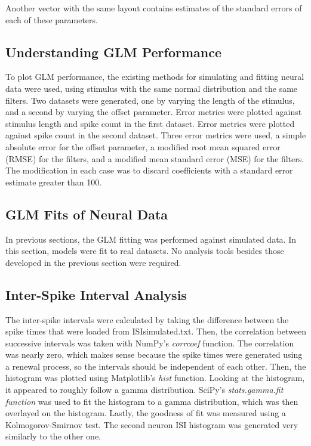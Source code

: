 \documentclass[letterpaper,titlepage,10pt]{article}
\begin{document}
Another vector with the same layout contains estimates of the standard errors of each of these parameters.

\subsection{Understanding GLM Performance}

To plot GLM performance, the existing methods for simulating and fitting neural data were used, using stimulus with
the same normal distribution and the same filters. Two datasets were generated, one by varying the length of the
stimulus, and a second by varying the offset parameter. Error metrics were plotted against stimulus length and spike
count in the first dataset. Error metrics were plotted against spike count in the second dataset. Three error metrics
were used, a simple absolute error for the offset parameter, a modified root mean squared error (RMSE) for the filters,
and a modified mean standard error (MSE) for the filters. The modification in each case was to discard coefficients
with a standard error estimate greater than 100.

\subsection{GLM Fits of Neural Data}

In previous sections, the GLM fitting was performed against simulated data. In this section, models were fit to real
datasets. No analysis tools besides those developed in the previous section were required.

\subsection{Inter-Spike Interval Analysis}

The inter-spike intervals were calculated by taking the difference between the spike times that were loaded from
ISIsimulated.txt. Then, the correlation between successive intervals was taken with NumPy's \textit{corrcoef} function.
The correlation was nearly zero, which makes sense because the spike times were generated using a renewal process,
so the intervals should be independent of each other. Then, the histogram was plotted using Matplotlib's \textit{hist}
function. Looking at the histogram, it appeared to roughly follow a gamma distribution. SciPy's \textit{stats.gamma.fit function}
was used to fit the histogram to a gamma distribution, which was then overlayed on the histogram. Lastly, the
goodness of fit was measured using a Kolmogorov-Smirnov test. The second neuron ISI histogram was generated very similarly to the other one.
\end{document}

